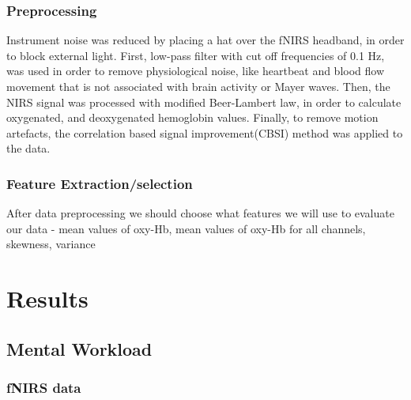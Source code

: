 \documentclass[a4paper]{report}
\begin{document}
			\subsubsection{Preprocessing}
			Instrument noise was reduced by placing a hat over the fNIRS headband, in order to block external light.
			First, low-pass filter with cut off frequencies of 0.1 Hz, was used in order to remove physiological noise, like heartbeat and blood flow movement that is not associated with brain activity or Mayer waves.
			Then, the NIRS signal was processed with modified Beer-Lambert law\cite{cope1988system}, in order to calculate oxygenated, and deoxygenated hemoglobin values.
			Finally, to remove motion artefacts, the correlation based signal improvement(CBSI)\cite{cui2010functional} method was applied to the data.
			\subsubsection{Feature Extraction/selection}
			After data preprocessing we should choose what features we will use to evaluate our data - mean values of oxy-Hb, mean values of oxy-Hb for all channels, skewness, variance
	\section{Results}
		\subsection{Mental Workload}
			\subsubsection{fNIRS data}	
\end{document}
